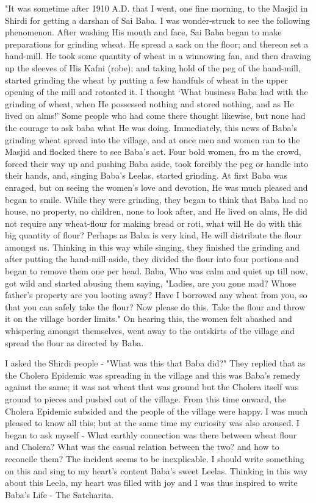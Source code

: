 "It was sometime after 1910 A.D. that I went, one fine morning, to the Masjid in Shirdi for getting a darshan of Sai Baba. I was wonder-struck to see the following phenomenon. After washing His mouth and face, Sai Baba began to make preparations for grinding wheat. He spread a sack on the floor; and thereon set a hand-mill. He took some quantity of wheat in a winnowing fan, and then drawing up the sleeves of His Kafni (robe); and taking hold of the peg of the hand-mill, started grinding the wheat by putting a few handfuls of wheat in the upper opening of the mill and rotoated it. I thought ‘What business Baba had with the grinding of wheat, when He possessed nothing and stored nothing, and as He lived on alms!’ Some people who had come there thought likewise, but none had the courage to ask baba what He was doing. Immediately, this news of Baba's grinding wheat spread into the village, and at once men and women ran to the Masjid and flocked there to see Baba's act. Four bold women, fro m the crowd, forced their way up and pushing Baba aside, took forcibly the peg or handle into their hands, and, singing Baba's Leelas, started grinding. At first Baba was enraged, but on seeing the women's love and devotion, He was much pleased and began to smile. While they were grinding, they began to think that Baba had no house, no property, no children, none to look after, and He lived on alms, He did not require any wheat-flour for making bread or roti, what will He do with this big quantity of flour? Perhaps as Baba is very kind, He will distribute the flour amongst us. Thinking in this way while singing, they finished the grinding and after putting the hand-mill aside, they divided the flour into four portions and began to remove them one per head. Baba, Who was calm and quiet up till now, got wild and started abusing them saying, "Ladies, are you gone mad? Whose father's property are you looting away? Have I borrowed any wheat from you, so that you can safely take the flour? Now please do this. Take the flour and throw it on the village border limits." On hearing this, the women felt abashed and whispering amongst themselves, went away to the outskirts of the village and spread the flour as directed by Baba.

I asked the Shirdi people - "What was this that Baba did?" They replied that as the Cholera Epidemic was spreading in the village and this was Baba's remedy against the same; it was not wheat that was ground but the Cholera itself was ground to pieces and pushed out of the village. From this time onward, the Cholera Epidemic subsided and the people of the village were happy. I was much pleased to know all this; but at the same time my curiosity was also aroused. I began to ask myself - What earthly connection was there between wheat flour and Cholera? What was the casual relation between the two? and how to reconcile them? The incident seems to be inexplicable. I should write something on this and sing to my heart's content Baba's sweet Leelas. Thinking in this way about this Leela, my heart was filled with joy and I was thus inspired to write Baba's Life - The Satcharita.

